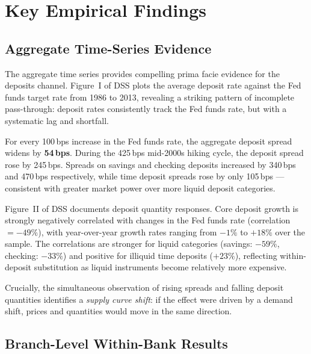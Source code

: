 \documentclass[12pt,a4paper]{article}
\begin{document}
\section{Key Empirical Findings}
\label{sec:results}

\subsection{Aggregate Time-Series Evidence}

The aggregate time series provides compelling prima facie evidence for the
deposits channel. Figure~I of DSS plots the average deposit rate against the
Fed funds target rate from 1986 to 2013, revealing a striking pattern of
incomplete pass-through: deposit rates consistently track the Fed funds rate,
but with a systematic lag and shortfall.

\begin{keybox}
For every 100\,bps increase in the Fed funds rate, the aggregate deposit spread
widens by \textbf{54\,bps}. During the 425\,bps mid-2000s hiking cycle, the
deposit spread rose by 245\,bps. Spreads on savings and checking deposits
increased by 340\,bps and 470\,bps respectively, while time deposit spreads
rose by only 105\,bps --- consistent with greater market power over more liquid
deposit categories.
\end{keybox}

Figure~II of DSS documents deposit quantity responses. Core deposit growth is
strongly negatively correlated with changes in the Fed funds rate (correlation
$= -49\%$), with year-over-year growth rates ranging from $-1\%$ to $+18\%$
over the sample. The correlations are stronger for liquid categories (savings:
$-59\%$, checking: $-33\%$) and positive for illiquid time deposits ($+23\%$),
reflecting within-deposit substitution as liquid instruments become relatively
more expensive.

Crucially, the simultaneous observation of rising spreads and falling deposit
quantities identifies a \emph{supply curve shift}: if the effect were driven
by a demand shift, prices and quantities would move in the same direction.

\subsection{Branch-Level Within-Bank Results}
\end{document}
